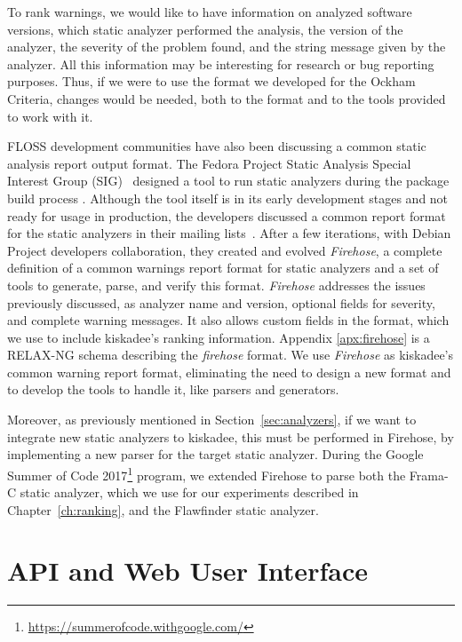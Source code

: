 To rank warnings, we would like to have information on analyzed software
versions, which static analyzer performed the analysis, the version of the
analyzer, the severity of the problem found, and the string message given by the
analyzer. All this information may be interesting for research or bug reporting
purposes. Thus, if we were to use the format we developed for the Ockham Criteria,
changes would be needed, both to the format and to the tools provided to work
with it.

FLOSS development communities have also been discussing a common static
analysis report output format. The Fedora Project Static Analysis Special
Interest Group (SIG)~\cite{fedora:static:sig} designed a tool to run static analyzers
during the
package build process \cite{fedora:mockwithanalysis}.  Although the tool itself
is in its early development stages and not ready for usage in production, the
developers discussed a common report format for the static
analyzers in their mailing lists~\cite{fedora:mlist}. After a few iterations, with Debian Project
developers collaboration, they created and evolved \textit{Firehose}, a complete definition
of a common warnings report format for static analyzers and a set of tools to
generate, parse, and verify this format.
\textit{Firehose} addresses the issues previously discussed, as analyzer name
and version, optional fields for severity, and complete warning messages. It also allows custom fields in the format, which we use to include kiskadee's ranking information.
Appendix \ref{apx:firehose} is a RELAX-NG schema describing the
\textit{firehose} format.
We use \textit{Firehose} as kiskadee's
common warning report format, eliminating the need to design a new format and
to develop the tools to handle it, like parsers and generators.

Moreover, as previously  mentioned in Section~\ref{sec:analyzers}, if we want
to integrate new static analyzers to kiskadee, this must be performed in
Firehose, by implementing a new parser for the target static analyzer. During
the Google Summer of Code
2017\footnote{\url{https://summerofcode.withgoogle.com/}} program, we extended
Firehose to parse both the Frama-C static analyzer, which we use for our
experiments described in Chapter~\ref{ch:ranking}, and the Flawfinder static
analyzer.

\section{API and Web User Interface}
\label{sec:api}

